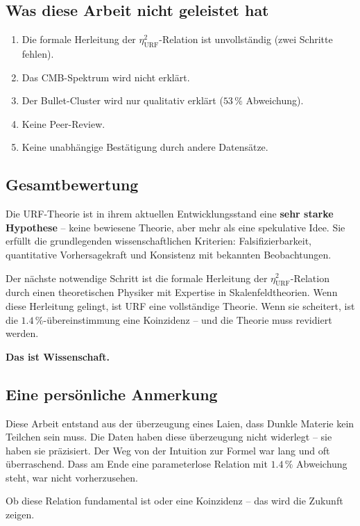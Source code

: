 \documentclass[12pt,a4paper]{article}
\theoremstyle{definition}
\begin{document}
\subsection{Was diese Arbeit nicht geleistet hat}

\begin{enumerate}
\item Die formale Herleitung der $\eta_{\mathrm{URF}}^2$-Relation ist unvollständig
(zwei Schritte fehlen).
\item Das CMB-Spektrum wird nicht erklärt.
\item Der Bullet-Cluster wird nur qualitativ erklärt ($53\,\%$ Abweichung).
\item Keine Peer-Review.
\item Keine unabhängige Bestätigung durch andere Datensätze.
\end{enumerate}

\subsection{Gesamtbewertung}

Die URF-Theorie ist in ihrem aktuellen Entwicklungsstand eine
\textbf{sehr starke Hypothese} -- keine bewiesene Theorie, aber mehr
als eine spekulative Idee. Sie erfüllt die grundlegenden wissenschaftlichen
Kriterien: Falsifizierbarkeit, quantitative Vorhersagekraft und Konsistenz
mit bekannten Beobachtungen.

Der nächste notwendige Schritt ist die formale Herleitung der
$\eta_{\mathrm{URF}}^2$-Relation durch einen theoretischen Physiker mit Expertise in
Skalenfeldtheorien. Wenn diese Herleitung gelingt, ist URF eine
vollständige Theorie. Wenn sie scheitert, ist die $1.4\,\%$-übereinstimmung
eine Koinzidenz -- und die Theorie muss revidiert werden.

\textbf{Das ist Wissenschaft.}

\subsection{Eine persönliche Anmerkung}

Diese Arbeit entstand aus der überzeugung eines Laien, dass Dunkle
Materie kein Teilchen sein muss. Die Daten haben diese überzeugung
nicht widerlegt -- sie haben sie präzisiert. Der Weg von der Intuition
zur Formel war lang und oft überraschend. Dass am Ende eine parameterlose
Relation mit $1.4\,\%$ Abweichung steht, war nicht vorherzusehen.

Ob diese Relation fundamental ist oder eine Koinzidenz -- das wird
die Zukunft zeigen.
\end{document}
